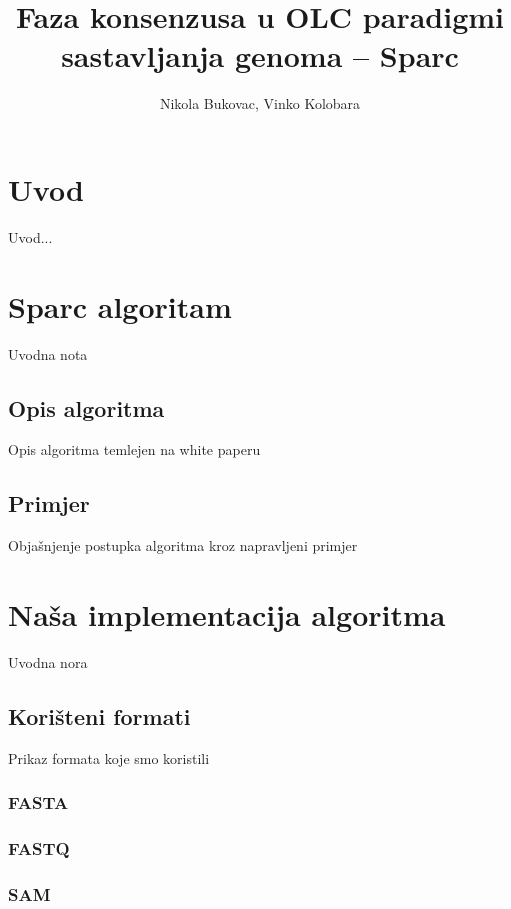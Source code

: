 \documentclass[times, utf8, seminar, numeric]{fer}
\begin{document}
\nocite{*}

\title{Faza konsenzusa u OLC paradigmi sastavljanja genoma – Sparc}

\author{Nikola Bukovac, Vinko Kolobara}


\maketitle

\tableofcontents

\chapter{Uvod}
Uvod...

\chapter{Sparc algoritam}
Uvodna nota
\section{Opis algoritma}
Opis algoritma temlejen na white paperu
\section{Primjer}
Objašnjenje postupka algoritma kroz napravljeni primjer

\chapter{Naša implementacija algoritma}
Uvodna nora
\section{Korišteni formati}
Prikaz formata koje smo koristili
\subsection{FASTA}
\subsection{FASTQ}
\subsection{SAM}
\end{document}

